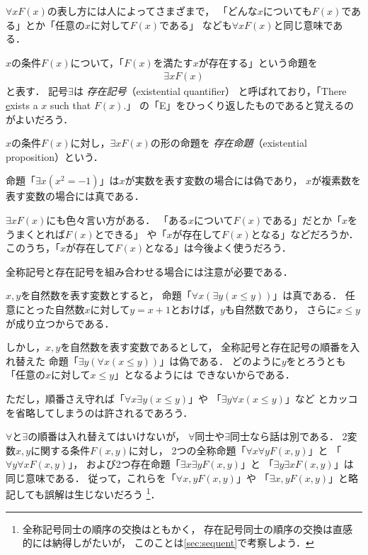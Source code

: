   $\forall x F(x)$の表し方には人によってさまざまで，
  「どんな$x$についても$F(x)$である」とか「任意の$x$に対して$F(x)$である」
  なども$\forall x F(x) $と同じ意味である．

  $x$の条件$F(x)$について，「$F(x)$を満たす$x$が存在する」という命題を
  \begin{align}
    \exists x F(x)
    \label{eq:exists}
  \end{align}
  と表す．
  記号$\exists$は
  \emph{存在記号}（existential quantifier）
  と呼ばれており，「There \underline{e}xists a $x$ such that $F(x)$.」
  の「E」をひっくり返したものであると覚えるのがよいだろう．
  
  $x$の条件$F(x)$に対し，$\exists x F(x)$の形の命題を
  \emph{存在命題}（existential proposition）という．
  \begin{ex}
    命題「$\exists x ( x^2 = -1)$」は$x$が実数を表す変数の場合には偽であり，
    $x$が複素数を表す変数の場合には真である．
  \end{ex}

  $\exists x F(x)$にも色々言い方がある．
  「ある$x$について$F(x)$である」だとか「$x$をうまくとれば$F(x)$とできる」
  や「$x$が存在して$F(x)$となる」などだろうか．
  このうち，「$x$が存在して$F(x)$となる」は今後よく使うだろう．

  全称記号と存在記号を組み合わせる場合には注意が必要である．
  \begin{ex}
    $x,  y$を自然数を表す変数とすると，
    命題「$\forall x ( \exists y ( x \leq y ))$」は真である．
    任意にとった自然数$x$に対して$y=x+1$とおけば，$y$も自然数であり，
    さらに$x \leq y$が成り立つからである．

    しかし，$x,  y$を自然数を表す変数であるとして，
    全称記号と存在記号の順番を入れ替えた
    命題「$\exists y ( \forall x ( x \leq y))$」は偽である．
    どのように$y$をとろうとも「任意の$x$に対して$x \leq y$」となるようには
    できないからである．

    ただし，順番さえ守れば「$\forall x \exists y ( x \leq y) $」や
    「$\exists y \forall x ( x \leq y )$」など
    とカッコを省略してしまうのは許されるであろう．
  \end{ex}
  

  $\forall$と$\exists$の順番は入れ替えてはいけないが，
  $\forall$同士や$\exists$同士なら話は別である．
  2変数$x,  y$に関する条件$F(x, y)$に対し，
  2つの全称命題「$\forall x \forall y F(x, y)$」と
  「$\forall y \forall x F(x, y)$」，
  および2つ存在命題「$\exists x \exists y F(x, y)$」と
  「$\exists y \exists x F(x, y)$」は同じ意味である．
  従って，これらを「$\forall x, y F(x, y)$」や
  「$\exists x, y F(x, y)$」と略記しても誤解は生じないだろう
  \footnote{全称記号同士の順序の交換はともかく，
  存在記号同士の順序の交換は直感的には納得しがたいが，
このことは\ref{sec:sequent}で考察しよう．}．
  
